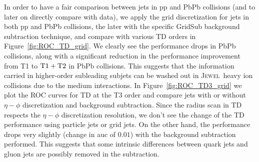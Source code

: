 \documentclass[notoc]{JHEP3}
\newcommand{\jw}{\textsc{Jewel}~}
\begin{document}
In order to have a fair comparison between jets in pp and PbPb collisions (and to later on directly compare with data), we apply the grid discretization for jets in both pp and PbPb collisions, the later with the specific GridSub background subtraction technique, and compare with various TD orders in Figure~\ref{fig:ROC_TD_grid}. We clearly see the performance drops in PbPb collisions, along with a significant reduction in the performance improvement from T1 to $\rm T1+T2$ in PbPb collisions. This suggests that the information carried in higher-order subleading subjets can be washed out in \jw heavy ion collisions due to the medium interactions. In Figure~\ref{fig:ROC_TD3_grid} we plot the ROC curves for TD at the T3 order and compare jets with or without $\eta-\phi$ discretization and background subtraction. Since the radius scan in TD respects the $\eta-\phi$ discretization resolution, we don't see the change of the TD performance using particle jets or grid jets. On the other hand, the performance drops very slightly (change in auc of $0.01$) with the background subtraction performed. This suggests that some intrinsic differences between quark jets and gluon jets are possibly removed in the subtraction.
\end{document}
